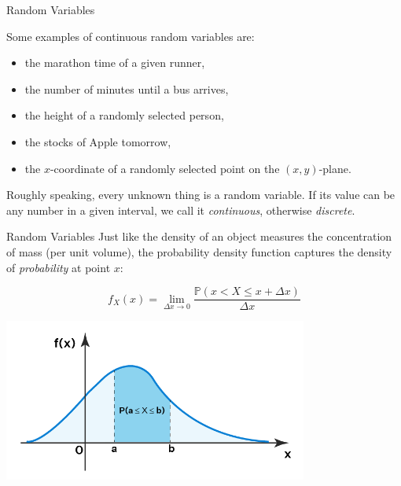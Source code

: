 \documentclass{beamer}
\newcommand{\PP}{\mathbb{P}}
\begin{document}
\begin{frame}{Random Variables}
    
\begin{example}
    Some examples of continuous random variables are:
    \begin{itemize}[<+->]
        \item the marathon time of a given runner,
        \item the number of minutes until a bus arrives,
        \item the height of a randomly selected person,
        \item the stocks of Apple tomorrow,
        \item the $x$-coordinate of a randomly selected point on the $(x,y)$-plane.
    \end{itemize}
\end{example}

\pause 

Roughly speaking, every unknown thing is a random variable. If its value can be any number in a given  interval, we call it \textit{continuous}, otherwise \textit{discrete}.

\end{frame}


\begin{frame}{Random Variables}
Just like the density of an object measures the concentration of mass (per unit volume), the probability density function captures the density of \textit{probability} at point $x$:

\[
f_X(x)=\lim_{\Delta x \to 0} \frac{\PP(x < X \leq x+\Delta x)}{\Delta x}
\]
 \pause
      \begin{center}

    \includegraphics[width=0.75\textwidth, height=\textheight, keepaspectratio]{pdf.png}
  \end{center}
 
\end{frame}
\end{document}

